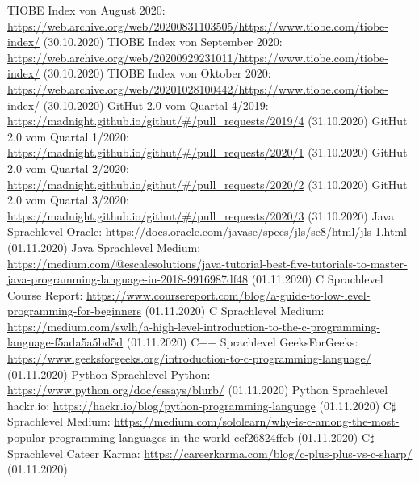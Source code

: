 \documentclass[ngerman]{article}
\begin{document}
\begin{thebibliography}{9}
        TIOBE Index von August 2020: \url{https://web.archive.org/web/20200831103505/https://www.tiobe.com/tiobe-index/} (30.10.2020)
        TIOBE Index von September 2020: \url{https://web.archive.org/web/20200929231011/https://www.tiobe.com/tiobe-index/} (30.10.2020)
        TIOBE Index von Oktober 2020: \url{https://web.archive.org/web/20201028100442/https://www.tiobe.com/tiobe-index/} (30.10.2020)
        GitHut 2.0 vom Quartal 4/2019: \url{https://madnight.github.io/githut/#/pull_requests/2019/4} (31.10.2020)
        GitHut 2.0 vom Quartal 1/2020: \url{https://madnight.github.io/githut/#/pull_requests/2020/1} (31.10.2020)
        GitHut 2.0 vom Quartal 2/2020: \url{https://madnight.github.io/githut/#/pull_requests/2020/2} (31.10.2020)
        GitHut 2.0 vom Quartal 3/2020: \url{https://madnight.github.io/githut/#/pull_requests/2020/3} (31.10.2020)
        Java Sprachlevel Oracle: \url{https://docs.oracle.com/javase/specs/jls/se8/html/jls-1.html} (01.11.2020)
        Java Sprachlevel Medium: \url{https://medium.com/@escalesolutions/java-tutorial-best-five-tutorials-to-master-java-programming-language-in-2018-9916987df48} (01.11.2020)
        C Sprachlevel Course Report: \url{https://www.coursereport.com/blog/a-guide-to-low-level-programming-for-beginners} (01.11.2020)
        C Sprachlevel Medium: \url{https://medium.com/swlh/a-high-level-introduction-to-the-c-programming-language-f5ada5a5bd5d} (01.11.2020)
        C++ Sprachlevel GeeksForGeeks: \url{https://www.geeksforgeeks.org/introduction-to-c-programming-language/} (01.11.2020)
        Python Sprachlevel Python: \url{https://www.python.org/doc/essays/blurb/} (01.11.2020)
        Python Sprachlevel hackr.io: \url{https://hackr.io/blog/python-programming-language} (01.11.2020)
        C$\sharp$ Sprachlevel Medium: \url{https://medium.com/sololearn/why-is-c-among-the-most-popular-programming-languages-in-the-world-ccf26824ffcb} (01.11.2020)
        C$\sharp$ Sprachlevel Cateer Karma: \url{https://careerkarma.com/blog/c-plus-plus-vs-c-sharp/} (01.11.2020)

\end{thebibliography}
\end{document}
